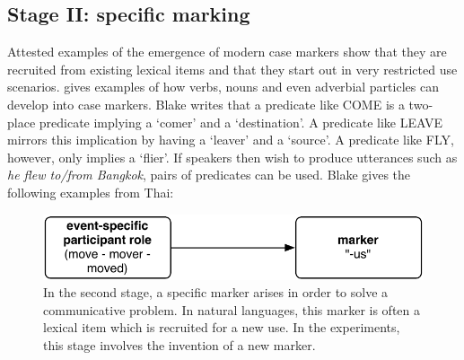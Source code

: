 \subsection{Stage II: specific marking}
\label{s:stage2}

Attested examples of the emergence of modern case markers show that they are recruited from existing lexical items and that they start out in very restricted use scenarios. \citet[chapter 6]{blake94case} gives examples of how verbs, nouns and even adverbial particles can develop into case markers. Blake writes that a predicate like COME is a two-place predicate implying a `comer' and a `destination'. A predicate like LEAVE mirrors this implication by having a `leaver' and a `source'. A predicate like FLY, however, only implies a `flier'. If speakers then wish to produce utterances such as {\em he flew to/from Bangkok}, pairs of predicates can be used. Blake gives the following examples from Thai:

\eal
\label{e:thai}
\hspace{0.2cm}\citep[163--164]{blake94case}
\zl

\begin{figure}[t]
\centerline{\includegraphics[scale=0.6]{chap-introduction/figs/stage2}}
  \caption[Formation of case markers: stage II]{In the second stage, a specific marker arises in order to solve a communicative problem. In natural languages, this marker is often a lexical item which is recruited for a new use. In the experiments, this stage involves the invention of a new marker.}
   \label{f:stage2}
\end{figure}

